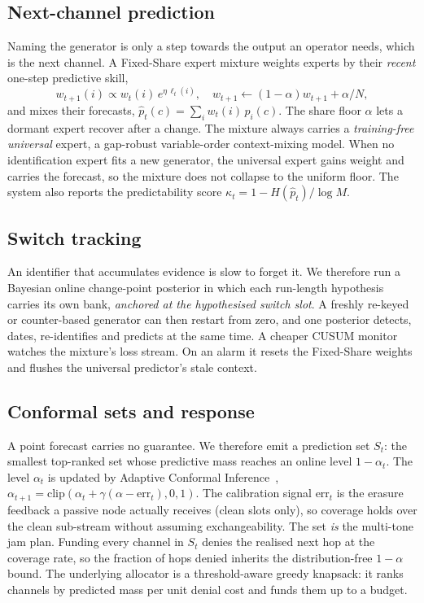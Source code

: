 \documentclass[conference]{IEEEtran}
\begin{document}
\subsection{Next-channel prediction}
\label{sec:predict}
Naming the generator is only a step towards the output an operator needs, which
is the next channel. A Fixed-Share expert mixture weights
experts by their \emph{recent} one-step predictive skill,
\begin{equation}
w_{t+1}(i)\propto w_t(i)\,e^{\eta\,\ell_t(i)},\quad
w_{t+1}\leftarrow(1-\alpha)w_{t+1}+\alpha/N,
\end{equation}
and mixes their forecasts, $\hat p_t(c)=\sum_i w_t(i)\,p_i(c)$. The share floor
$\alpha$ lets a dormant expert recover after a change. The mixture always
carries a \emph{training-free universal} expert, a gap-robust variable-order
context-mixing model. When no identification expert fits a new generator, the
universal expert gains weight and carries the forecast, so the mixture does
not collapse to the uniform floor. The system also reports the predictability
score $\kappa_t=1-H(\hat p_t)/\log M$.

\subsection{Switch tracking}
\label{sec:switch}
An identifier that accumulates evidence is slow to forget it. We therefore run
a Bayesian online change-point posterior in which each run-length hypothesis
carries its own bank, \emph{anchored at the hypothesised switch slot}. A
freshly re-keyed or counter-based generator can then restart from zero, and
one posterior detects, dates, re-identifies and predicts at the same time. A
cheaper CUSUM monitor watches the mixture's loss stream. On an alarm it resets
the Fixed-Share weights and flushes the universal predictor's stale context.

\subsection{Conformal sets and response}
\label{sec:conformal}
A point forecast carries no guarantee. We therefore emit a prediction set
$S_t$: the smallest top-ranked set whose predictive mass reaches an online
level $1-\alpha_t$. The level $\alpha_t$ is updated by Adaptive Conformal
Inference~\cite{gibbs2021},
$\alpha_{t+1}=\mathrm{clip}(\alpha_t+\gamma(\alpha-\mathrm{err}_t),0,1)$. The
calibration signal $\mathrm{err}_t$ is the erasure feedback a passive node
actually receives (clean slots only), so coverage holds over the clean
sub-stream without assuming exchangeability. The set \emph{is} the multi-tone
jam plan. Funding every channel in $S_t$ denies the realised next hop at the
coverage rate, so the fraction of hops denied inherits the distribution-free
$1-\alpha$ bound. The underlying allocator is a threshold-aware greedy
knapsack: it ranks channels by predicted mass per unit denial cost and funds
them up to a budget.
\end{document}
